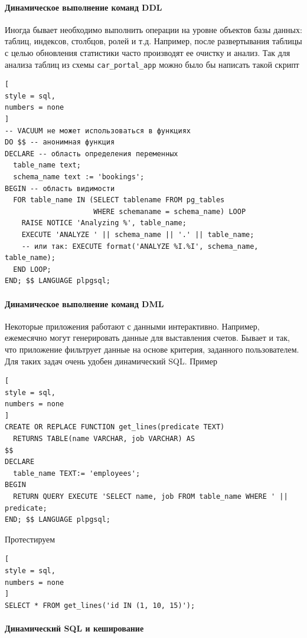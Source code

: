 \documentclass[%
	11pt,
	a4paper,
	utf8,
		]{article}
\begin{document}
\paragraph{Динамическое выполнение команд DDL} Иногда бывает необходимо выполнить операции на уровне объектов базы данных: таблиц, индексов, столбцов, ролей и т.д. Например, после развертывания таблицы с целью обновления статистики часто производят ее очистку и анализ. Так для анализа таблиц из схемы \texttt{car\_portal\_app} можно было бы написать такой скрипт
\begin{lstlisting}[
style = sql,
numbers = none
]
-- VACUUM не может использоваться в функциях
DO $$ -- анонимная функция
DECLARE -- область определения переменных
  table_name text;
  schema_name text := 'bookings';
BEGIN -- область видимости
  FOR table_name IN (SELECT tablename FROM pg_tables
                     WHERE schemaname = schema_name) LOOP
    RAISE NOTICE 'Analyzing %', table_name;
    EXECUTE 'ANALYZE ' || schema_name || '.' || table_name;
    -- или так: EXECUTE format('ANALYZE %I.%I', schema_name, table_name);
  END LOOP;
END; $$ LANGUAGE plpgsql;
\end{lstlisting}

\paragraph{Динамическое выполнение команд DML} Некоторые приложения работают с данными интерактивно. Например, ежемесячно могут генерировать данные для выставления счетов. Бывает и так, что приложение фильтрует данные на основе критерия, заданного пользователем. Для таких задач очень удобен динамический SQL. Пример
\begin{lstlisting}[
style = sql,
numbers = none
]
CREATE OR REPLACE FUNCTION get_lines(predicate TEXT)
  RETURNS TABLE(name VARCHAR, job VARCHAR) AS
$$
DECLARE
  table_name TEXT:= 'employees';
BEGIN
  RETURN QUERY EXECUTE 'SELECT name, job FROM table_name WHERE ' || predicate;
END; $$ LANGUAGE plpgsql;
\end{lstlisting}

Протестируем
\begin{lstlisting}[
style = sql,
numbers = none
]
SELECT * FROM get_lines('id IN (1, 10, 15)');
\end{lstlisting}

\paragraph{Динамический SQL и кеширование}
\end{document}
